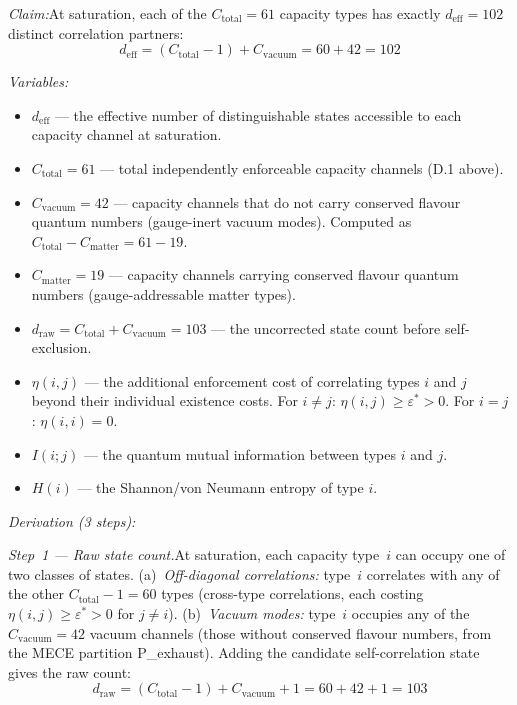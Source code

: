 \documentclass[11pt]{article}
\newcommand{\Ctot}{C_{\mathrm{total}}}
\newcommand{\deff}{d_{\mathrm{eff}}}
\newcommand{\eps}{\varepsilon}
\begin{document}
\begin{tcolorbox}[apfbox, title={L\_self\_exclusion: Effective Dimension per Capacity Channel}]
\textit{Claim:}\quad At saturation, each of the $\Ctot = 61$ capacity types has exactly $\deff = 102$ distinct correlation partners:
\begin{equation}
\deff = (\Ctot - 1) + C_{\mathrm{vacuum}} = 60 + 42 = 102
\label{eq:deff}
\end{equation}

\smallskip\noindent\textit{Variables:}
\begin{itemize}[nosep,leftmargin=2em]
\item $\deff$ --- the effective number of distinguishable states accessible to each capacity channel at saturation.
\item $\Ctot = 61$ --- total independently enforceable capacity channels (D.1 above).
\item $C_{\mathrm{vacuum}} = 42$ --- capacity channels that do not carry conserved flavour quantum numbers (gauge-inert vacuum modes).  Computed as $\Ctot - C_{\mathrm{matter}} = 61 - 19$.
\item $C_{\mathrm{matter}} = 19$ --- capacity channels carrying conserved flavour quantum numbers (gauge-addressable matter types).
\item $d_{\mathrm{raw}} = \Ctot + C_{\mathrm{vacuum}} = 103$ --- the uncorrected state count before self-exclusion.
\item $\eta(i,j)$ --- the additional enforcement cost of correlating types $i$ and $j$ beyond their individual existence costs.  For $i \ne j$: $\eta(i,j) \ge \eps^* > 0$.  For $i = j$: $\eta(i,i) = 0$.
\item $I(i;j)$ --- the quantum mutual information between types $i$ and $j$.
\item $H(i)$ --- the Shannon/von Neumann entropy of type $i$.
\end{itemize}
\end{tcolorbox}

\textit{Derivation (3 steps):}

\textit{Step~1 --- Raw state count.}\quad At saturation, each capacity type~$i$ can occupy one of two classes of states.  (a)~\emph{Off-diagonal correlations:} type~$i$ correlates with any of the other $\Ctot - 1 = 60$ types (cross-type correlations, each costing $\eta(i,j) \ge \eps^* > 0$ for $j \ne i$).  (b)~\emph{Vacuum modes:} type~$i$ occupies any of the $C_{\mathrm{vacuum}} = 42$ vacuum channels (those without conserved flavour numbers, from the MECE partition P\_exhaust).  Adding the candidate self-correlation state gives the raw count:
\begin{equation}
d_{\mathrm{raw}} = (\Ctot - 1) + C_{\mathrm{vacuum}} + 1 = 60 + 42 + 1 = 103
\end{equation}
\end{document}
